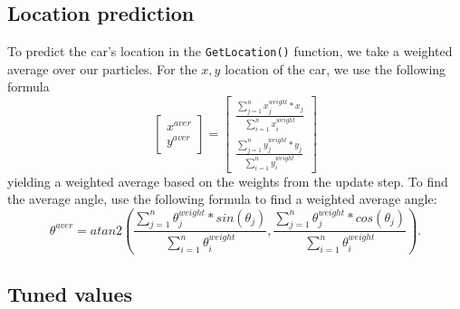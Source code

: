 \subsection{Location prediction}
To predict the car's location in the \texttt{GetLocation()} function, we take a weighted average over our particles. For the $x, y$ location of the car, we use the following formula 
$$
        \begin{bmatrix} x^{aver} \\ y^{aver} \end{bmatrix} = 
        \begin{bmatrix}
             \frac{\sum_{j=1}^{n} x_j^{weight} * x_j}{\sum_{i = 1}^{n} x_i^{weight}} \\
             \frac{\sum_{j=1}^{n} y_j^{weight} * y_j}{\sum_{i = 1}^{n} y_i^{weight}}
        \end{bmatrix}
$$ yielding a weighted average based on the weights from the update step. To find the average angle, use the following formula to find a weighted average angle: 
$$
    \theta^{aver} = atan2(\frac{\sum_{j=1}^n \theta_j^{weight} * sin(\theta_j)}{\sum_{i = 1}^{n} \theta_i^{weight}}, \frac{\sum_{j=1}^n \theta_j^{weight} * cos(\theta_j)}{\sum_{i = 1}^{n} \theta_i^{weight}}).
$$

\subsection{Tuned values}

